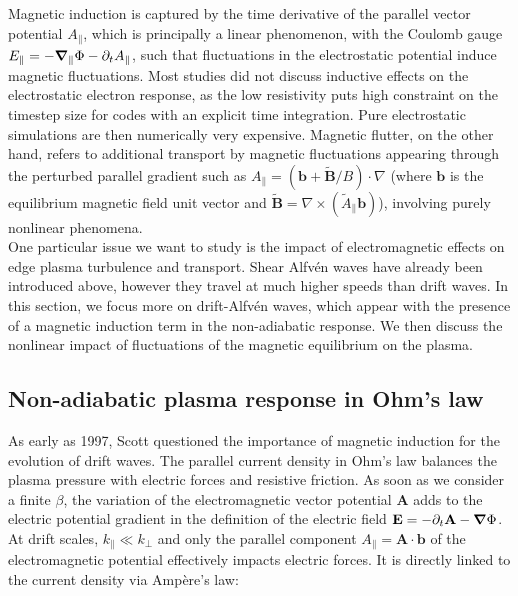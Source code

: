 Magnetic induction is captured by the time derivative of the parallel vector potential $A_\parallel$, which is principally a linear phenomenon, with the Coulomb gauge $E_\parallel = - \grad_\parallel \Phi - \partial_t A_\parallel$, such that fluctuations in the electrostatic potential induce magnetic fluctuations. Most studies did not discuss inductive effects on the electrostatic electron response, as the low resistivity puts high constraint on the timestep size for codes with an explicit time integration\cite{stegmeir2019, giacomin2022gbs}. Pure electrostatic simulations are then numerically very expensive. Magnetic flutter\cite{callen_1977}, on the other hand, refers to additional transport by magnetic fluctuations appearing through the perturbed parallel gradient such as $A_\parallel = (\boldsymbol{b} + \boldsymbol{\tilde{B}}/B) \cdot \nabla$ (where $\boldsymbol{b}$ is the equilibrium magnetic field unit vector and $\boldsymbol{\tilde{B}} = \nabla \times (\tilde{A}_\parallel \boldsymbol{b})$), involving purely nonlinear phenomena.  \\


One particular issue we want to study is the impact of electromagnetic effects
on edge plasma turbulence and transport. Shear Alfvén waves have already been introduced above, however they travel at much higher speeds than drift waves. In this section, we focus more on drift-Alfvén waves, which appear with the presence of a magnetic induction term in the non-adiabatic response. We then discuss the nonlinear impact of fluctuations of the magnetic equilibrium on the plasma.


\subsection{Non-adiabatic plasma response in Ohm's law}

As early as 1997, Scott\cite{scott1997} questioned the importance of magnetic induction for the evolution of drift waves. The parallel current density in Ohm's law balances the plasma pressure with electric forces and resistive friction. As soon as we consider a finite $\beta$, the variation of the electromagnetic vector potential $\mathbf{A}$ adds to the electric potential gradient in the definition of the electric field $ \mathbf{E} = -\partial_t \mathbf{A} - \grad \Phi$. At drift scales, $k_\parallel \ll k_\perp$ and only the parallel component $A_\parallel = \mathbf{A}\cdot\mathbf{b}$ of the electromagnetic potential effectively impacts electric forces. It is directly linked to the current density via Ampère's law: 

